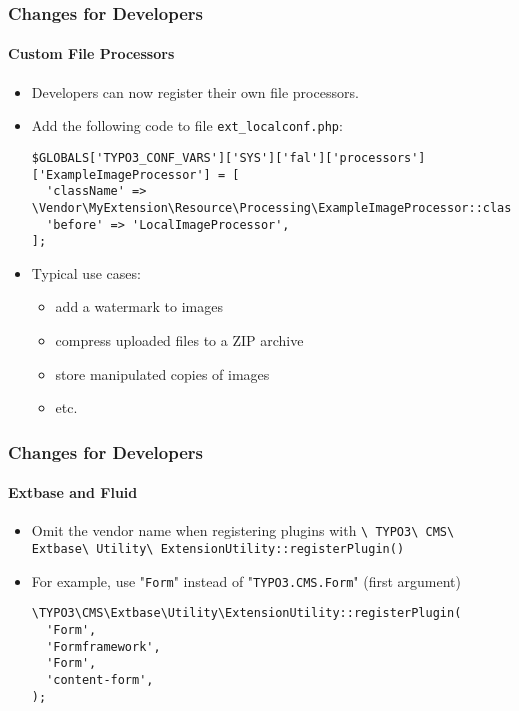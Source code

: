 \begin{frame}[fragile]
	\frametitle{Changes for Developers}
	\framesubtitle{Custom File Processors}

	\lstset{basicstyle=\tiny\ttfamily}

	\begin{itemize}
		\item Developers can now register their own file processors.
		\item Add the following code to file \texttt{ext\_localconf.php}:

\begin{lstlisting}
$GLOBALS['TYPO3_CONF_VARS']['SYS']['fal']['processors']['ExampleImageProcessor'] = [
  'className' => \Vendor\MyExtension\Resource\Processing\ExampleImageProcessor::class,
  'before' => 'LocalImageProcessor',
];
\end{lstlisting}

		\item Typical use cases:

			\begin{itemize}
				\item add a watermark to images
				\item compress uploaded files to a ZIP archive
				\item store manipulated copies of images
				\item etc.
			\end{itemize}

	\end{itemize}

\end{frame}


\begin{frame}[fragile]
	\frametitle{Changes for Developers}
	\framesubtitle{Extbase and Fluid}

	\lstset{basicstyle=\smaller\ttfamily}

	\begin{itemize}
		\item Omit the vendor name when registering plugins with\newline
			\smaller
				\texttt{\textbackslash
					TYPO3\textbackslash
					CMS\textbackslash
					Extbase\textbackslash
					Utility\textbackslash
					ExtensionUtility::registerPlugin()}
			\normalsize

		\item For example, use "\texttt{Form}" instead of "\texttt{TYPO3.CMS.Form}"\newline
			\small(first argument)\normalsize

\begin{lstlisting}
\TYPO3\CMS\Extbase\Utility\ExtensionUtility::registerPlugin(
  'Form',
  'Formframework',
  'Form',
  'content-form',
);
\end{lstlisting}

	\end{itemize}

\end{frame}

